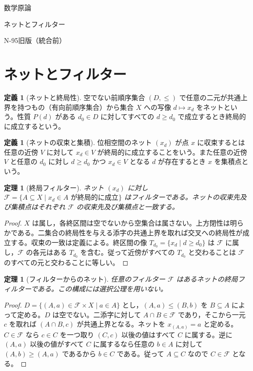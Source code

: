 \documentclass[a5paper,10pt,dvipdfmx]{jsarticle}
\theoremstyle{definition}
\newtheorem{defn}[ruledef]{定義}
\theoremstyle{plain}
\newtheorem{thm}[ruledef]{定理}
\begin{document}
\begin{center}
{\small 数学原論}\par\vspace{4mm}
{\LARGE ネットとフィルター}\par\vspace{2mm}
{\small N-95\quad 旧版（統合前）}
\end{center}
\section{ネットとフィルター}
\begin{defn}[ネットと終局性]\label{k273}
空でない前順序集合 $(D,\leq)$ で任意の二元が共通上界を持つもの（有向前順序集合）から集合 $X$ への写像 $d\mapsto x_d$ をネットという。性質 $P(d)$ がある $d_0\in D$ に対してすべての $d\geq d_0$ で成立するとき終局的に成立するという。
\end{defn}
\begin{defn}[ネットの収束と集積]\label{k274}
位相空間のネット $(x_d)$ が点 $x$ に収束するとは任意の近傍 $V$ に対して $x_d\in V$ が終局的に成立することをいう。また任意の近傍 $V$ と任意の $d_0$ に対し $d\geq d_0$ かつ $x_d\in V$ となる $d$ が存在するとき $x$ を集積点という。
\end{defn}
\begin{thm}[終局フィルター]\label{k275}
ネット $(x_d)$ に対し $\mathcal F=\{A\subseteq X\mid x_d\in A\text{ が終局的に成立}\}$ はフィルターである。ネットの収束先及び集積点はそれぞれ $\mathcal F$ の収束先及び集積点と一致する。
\end{thm}
\begin{proof}
$X$ は属し，各終区間は空でないから空集合は属さない。上方閉性は明らかである。二集合の終局性を与える添字の共通上界を取れば交叉への終局性が成立する。収束の一致は定義による。終区間の像 $T_{d_0}=\{x_d\mid d\geq d_0\}$ は $\mathcal F$ に属し，$\mathcal F$ の各元はある $T_{d_0}$ を含む。従って近傍がすべての $T_{d_0}$ と交わることは $\mathcal F$ のすべての元と交わることに等しい。
\end{proof}
\begin{thm}[フィルターからのネット]\label{k276}
任意のフィルター $\mathcal F$ はあるネットの終局フィルターである。この構成には選択公理を用いない。
\end{thm}
\begin{proof}
$D=\{(A,a)\in\mathcal F\times X\mid a\in A\}$ とし，$(A,a)\leq(B,b)$ を $B\subseteq A$ によって定める。$D$ は空でない。二添字に対して $A\cap B\in\mathcal F$ であり，そこから一元 $c$ を取れば $(A\cap B,c)$ が共通上界となる。ネットを $x_{(A,a)}=a$ と定める。$C\in\mathcal F$ なら $c\in C$ を一つ取り $(C,c)$ 以後の値はすべて $C$ に属する。逆に $(A,a)$ 以後の値がすべて $C$ に属するなら任意の $b\in A$ に対して $(A,b)\geq(A,a)$ であるから $b\in C$ である。従って $A\subseteq C$ なので $C\in\mathcal F$ となる。
\end{proof}
\end{document}
